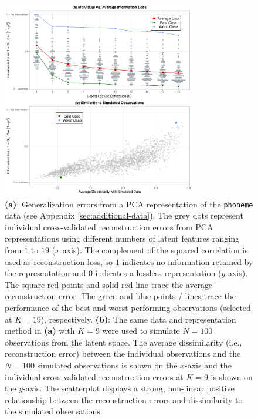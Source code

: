 \begin{figure}
    \centering
    \includegraphics[width=0.75\textwidth]{figures/info-loss-02.pdf}
    \caption{
    \textbf{(a)}: Generalization errors from a PCA representation of the \texttt{phoneme} data (see Appendix \ref{sec:additional-data}). The grey dots represent individual cross-validated reconstruction errors from PCA representations using different numbers of latent features ranging from $1$ to $19$ ($x$ axis).
    The complement of the squared correlation is used as reconstruction loss, so $1$ indicates no information retained by the representation and $0$ indicates a lossless representation ($y$ axis).
    The square red points and solid red line trace the average reconstruction error. The green and blue points / lines trace the performance of the best and worst performing observations (selected at $K=19$), respectively.
    \textbf{(b)}: The same data and representation method in \textbf{(a)} with $K=9$ were used to simulate $N = 100$ observations from the latent space.
    The average dissimilarity (i.e., reconstruction error) between the individual observations and the $N=100$ simulated observations is shown on the $x$-axis and the individual cross-validated reconstruction errors at $K=9$ is shown on the $y$-axis. The scatterplot displays a strong, non-linear positive relationship between the reconstruction errors and dissimilarity to the simulated observations.
    }
    \label{fig:ind-losses}
\end{figure}


